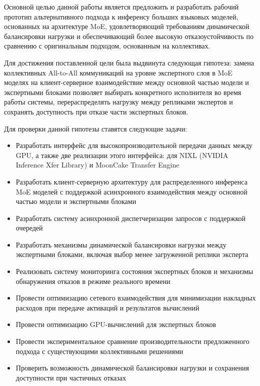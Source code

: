 Основной целью данной работы является предложить и разработать рабочий прототип альтернативного подхода к инференсу больших языковых моделей, основанных на архитектуре MoE, удовлетворяющий требованиям динамической балансировки нагрузки и обеспечивающий более высокую отказоустойчивость по сравнению с оригинальным подходом, основанным на коллективах.

Для достижения поставленной цели была выдвинута следующая гипотеза: замена коллективных All-to-All коммуникаций на уровне экспертного слоя в MoE моделях на клиент-серверное взаимодействие между основной частью модели и экспертными блоками позволяет выбирать конкретного исполнителя во время работы системы, перераспределять нагрузку между репликами экспертов и сохранять доступность при отказе части экспертных блоков.

Для проверки данной гипотезы ставятся следующие задачи:

\begin{itemize}
    \item Разработать интерфейс для высокопроизводительной передачи данных между GPU, а также две реализации этого интерфейса: для NIXL (NVIDIA Inference Xfer Library) и MoonCake Transfer Engine
    \item Разработать клиент-серверную архитектуру для распределенного инференса MoE моделей с поддержкой асинхронного взаимодействия между основной частью модели и экспертными блоками
    \item Разработать систему асинхронной диспетчеризации запросов с поддержкой очередей
    \item Разработать механизмы динамической балансировки нагрузки между экспертными блоками, включая выбор менее загруженной реплики эксперта
    \item Реализовать систему мониторинга состояния экспертных блоков и механизмы обнаружения отказов в режиме реального времени
    \item Провести оптимизацию сетевого взаимодействия для минимизации накладных расходов при передаче активаций и результатов вычислений
    \item Провести оптимизацию GPU-вычислений для экспертных блоков
    \item Провести экспериментальное сравнение производительности предложенного подхода с существующими коллективными решениями
    \item Проверить возможность динамической балансировки нагрузки и сохранения доступности при частичных отказах
\end{itemize}

